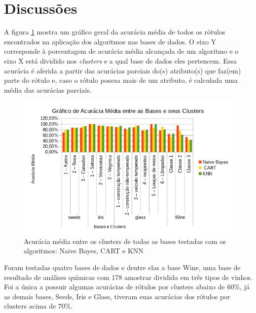 \section{Discussões}


A figura  \ref{fig:acuracia_media_algoritmos} mostra um gráfico geral da acurácia média de todos os rótulos encontrados na aplicação dos algoritmos nas bases de dados. O eixo Y corresponde à porcentagem de acurácia média alcançada de um algoritmo e o eixo X está dividido nos \textit{clusters} e a qual base de dados eles pertencem. Essa acurácia é aferida a partir das acurácias parciais do(s) atributo(s) que faz(em) parte do rótulo e, caso o rótulo possua mais de um atributo, é calculada uma média das acurácias parciais. 

\begin{figure}[h!]
        \centering
        \includegraphics[scale=0.9]{figs/grafico_acuracia_media_algoritmos.png}
        \caption{Acurácia média entre os clusters de todas as bases testadas com os algoritmos: Naive Bayes, CART e KNN} \label{fig:acuracia_media_algoritmos}
\end{figure}

Foram testadas quatro bases de dados e dentre elas a base Wine, uma base de resultado de análises químicas com 178 amostras dividida em três tipos de vinhos. Foi a única a possuir algumas acurácias de rótulos por clusters abaixo de 60\%, já as demais bases, Seeds, Iris e Glass, tiveram suas acurácias dos rótulos por clusters acima de 70\%.




